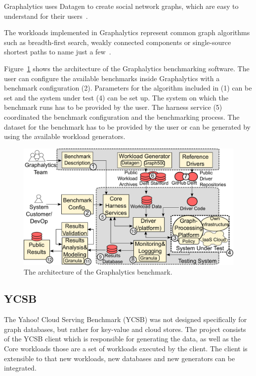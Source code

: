 Graphalytics uses Datagen to create social network graphs,
which are easy to understand for their users~\cite[3]{Capota2015c}.

The workloads implemented in Graphalytics represent common graph algorithms such as breadth-first search,
weakly connected components or single-source shortest paths to name just a few~\cite[7]{Iosup}.

Figure~\ref{fig:graphalyticsArchitecture} shows the architecture of the Graphalytics benchmarking software.
The user can configure the available benchmarks inside Graphalytics with a benchmark configuration (2).
Parameters for the algorithm included in (1) can be set and the system under test (4) can be set up.
The system on which the benchmark runs has to be provided by the user.
The harness service (5) coordinated the benchmark configuration and the benchmarking process.
The dataset for the benchmark has to be provided by the user or can be generated by using the available workload generators.\cite[11]{Iosup}
\pagebreak

\begin{figure}[h!]
  \centering
  \includegraphics[width=.75\textwidth]{images/benchmarks/GraphalyticsArchitecture}
  \caption{The architecture of the Graphalytics benchmark\cite[11]{Iosup}.}
  \label{fig:graphalyticsArchitecture}
\end{figure}

\subsection{YCSB}
\label{ch:background:se:ycsb}
The Yahoo! Cloud Serving Benchmark (YCSB) was not designed specifically for graph databases,
but rather for key-value and cloud stores.
The project consists of the YCSB client which is responsible for generating the data,
as well as the Core workloads those are a set of workloads executed by the client.
The client is extensible to that new workloads,
new databases and new generators can be integrated.~\cite{Yahoo!2010}

